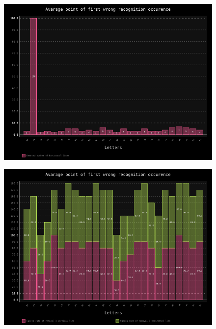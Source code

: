 \documentclass[a4paper]{article}
\begin{document}
\begin{figure}[h!]
	\centering
	\includegraphics[scale=0.7,keepaspectratio=true]{Charts/LinesHorTestPlanResultsChart_ClasifierTester.png}	
	\caption{}
	\label{hor_lines_clas}
\end{figure}

\begin{figure}[h!]
	\centering
	\includegraphics[scale=0.7,keepaspectratio=true]{Charts/Removed_linesTestPlanResultsChart_NormalTester.png}	
	\caption{}
	\label{lines_trans}
\end{figure}
\end{document}
